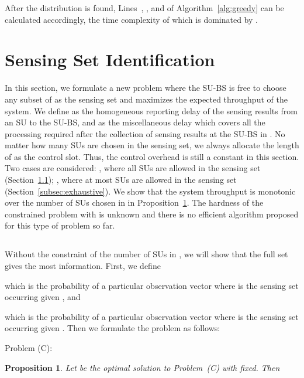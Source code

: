 \documentclass[conference]{IEEEtran}
\newtheorem{proposition}[theorem]{Proposition}
\begin{document}
After the  distribution is found, Lines~, ,  and  of Algorithm~\ref{alg:greedy} can be calculated accordingly, the time complexity of which is dominated by . 

\section{Sensing Set Identification}
\label{sec:uncertain_set}
In this section, we formulate a new problem where the SU-BS is free to choose any subset of  as the sensing set and maximizes the expected throughput of the system. We define  as the homogeneous reporting delay of the sensing results from an SU to the SU-BS, and  as the miscellaneous delay which covers all the processing required after the collection of sensing results at the SU-BS in . No matter how many SUs are chosen in the sensing set, we always allocate the length of  as the control slot. Thus, the control overhead is still a constant in this section. Two cases are considered: , where all SUs are allowed in the sensing set (Section~\ref{subsec:const}); , where at most  SUs are allowed in the sensing set (Section~\ref{subsec:exhaustive}). We show that the system throughput is monotonic over the number of SUs chosen in  in Proposition~\ref{prop:more_better}. The hardness of the constrained problem with  is unknown and there is no efficient algorithm proposed for this type of problem so far. 

\subsection{}
\label{subsec:const}

Without the constraint of the number of SUs in , we will show that the full set gives the most information. First, we define 
\vspace{-0.5em}

which is the probability of a particular observation vector  where  is the sensing set occurring given , and 
\vspace{-0.2em}
 
which is the probability of a particular observation vector  where  is the sensing set occurring given . Then we formulate the problem as follows:

Problem (C):
\vspace{-0.8em}





\begin{proposition}
\label{prop:more_better}
Let  be the optimal solution to Problem~(C) with  fixed. Then 
\vspace{-0.3em}

\end{proposition}
\end{document}
